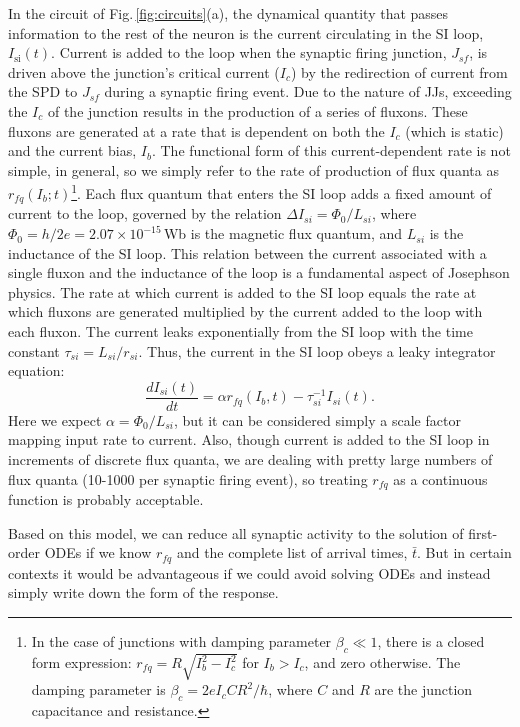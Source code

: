 \documentclass[]{article}
\begin{document}
In the circuit of Fig.\,\ref{fig:circuits}(a), the dynamical quantity that passes information to the rest of the neuron is the current circulating in the SI loop, $I_{\mathrm{si}}(t)$. Current is added to the loop when the synaptic firing junction, $J_{sf}$, is driven above the junction's critical current ($I_c$) by the redirection of current from the SPD to $J_{sf}$ during a synaptic firing event. Due to the nature of JJs, exceeding the $I_c$ of the junction results in the production of a series of fluxons. These fluxons are generated at a rate that is dependent on both the $I_c$ (which is static) and the current bias, $I_b$. The functional form of this current-dependent rate is not simple, in general, so we simply refer to the rate of production of flux quanta as $r_{fq}(I_b;t)$\footnote{In the case of junctions with damping parameter $\beta_c\ll 1$, there is a closed form expression: $r_{fq} = R\sqrt{I_b^2-I_c^2}$ for $I_b > I_c$, and zero otherwise. The damping parameter is $\beta_c = 2eI_cCR^2/\hbar$, where $C$ and $R$ are the junction capacitance and resistance.}. Each flux quantum that enters the SI loop adds a fixed amount of current to the loop, governed by the relation $\Delta I_{si} = \Phi_0/L_{si}$, where $\Phi_{0} = h/2e = 2.07\times 10^{-15}$\,Wb is the magnetic flux quantum, and $L_{si}$ is the inductance of the SI loop. This relation between the current associated with a single fluxon and the inductance of the loop is a fundamental aspect of Josephson physics. The rate at which current is added to the SI loop equals the rate at which fluxons are generated multiplied by the current added to the loop with each fluxon. The current leaks exponentially from the SI loop with the time constant $\tau_{si} = L_{si}/r_{si}$. Thus, the current in the SI loop obeys a leaky integrator equation:
\begin{equation}
\label{eq:leaky_integrator__SI_loop}
\frac{dI_{si}(t)}{dt} = \alpha r_{fq}(I_b,t)-\tau_{si}^{-1}I_{si}(t).
\end{equation}
Here we expect $\alpha = \Phi_0/L_{si}$, but it can be considered simply a scale factor mapping input rate to current. Also, though current is added to the SI loop in increments of discrete flux quanta, we are dealing with pretty large numbers of flux quanta (10-1000 per synaptic firing event), so treating $r_{fq}$ as a continuous function is probably acceptable.

Based on this model, we can reduce all synaptic activity to the solution of first-order ODEs if we know $r_{fq}$ and the complete list of arrival times, $\bar{t}$. But in certain contexts it would be advantageous if we could avoid solving ODEs and instead simply write down the form of the response.
\end{document}
